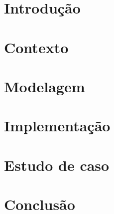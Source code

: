 \section{Introdução}

\section{Contexto}

\section{Modelagem}

\section{Implementação}

\section{Estudo de caso}

\section{Conclusão}